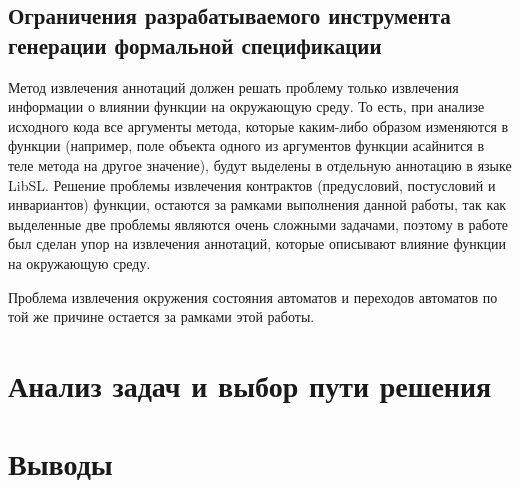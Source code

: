 \subsection{Ограничения разрабатываемого инструмента генерации формальной спецификации}

Метод извлечения аннотаций должен решать проблему только извлечения информации о влиянии функции на окружающую среду.
То есть, при анализе исходного кода все аргументы метода, которые каким-либо образом изменяются в функции (например, поле объекта одного из аргументов функции асайнится в теле метода на другое значение), будут выделены в отдельную аннотацию в языке LibSL.
Решение проблемы извлечения контрактов (предусловий, постусловий и инвариантов) функции,
остаются за рамками выполнения данной работы, так как выделенные две проблемы являются очень сложными задачами,
поэтому в работе был сделан упор на извлечения аннотаций, которые описывают влияние функции на окружающую среду.

Проблема извлечения окружения состояния автоматов и переходов автоматов по той же причине остается за рамками этой работы.

\section{Анализ задач и выбор пути решения}



\section{Выводы}

